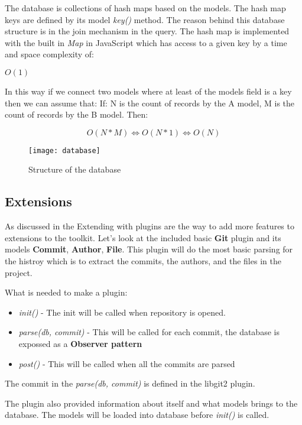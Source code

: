 The database is collections of hash maps based on the models. The hash map keys are defined by its model \textit{key()} method.
The reason behind this database structure is in the join mechanism in the query. The hash map is implemented with the built in 
\textit{Map}\cite{map} in JavaScript which has access to a given key by a time and space complexity of:

\( O(1) \)

In this way if we connect two models where at least of the models field is a key then we can assume that:\newline
If: N is the count of records by the A model, M  is the count of records by the B model. Then:
	
\[O(N * M) \Leftrightarrow O(N * 1) \Leftrightarrow O(N)\]

\begin{figure}[H]
	\centering
	\texttt{[image: database]}
	\caption{Structure of the database}
	\label{fig:fig-help}
\end{figure}
\newpage

\subsection{Extensions}

As discussed in the Extending with plugins are the way to add more features to extensions to the toolkit.
Let's look at the included basic \textbf{Git} plugin and its models \textbf{Commit}, \textbf{Author}, \textbf{File}.
This plugin will do the most basic parsing for the histroy which is to extract the commits, the authors, and the files
in the project.

What is needed to make a plugin:
\begin{itemize}
	\item \textit{init()} - The init will be called when repository is opened.
	\item \textit{parse(db, commit)} - This will be called for each commit, the database is expossed as a \textbf{Observer pattern}
	\item \textit{post()} - This will be called when all the commits are parsed
\end{itemize}

The commit in the \textit{parse(db, commit)} is defined in the libgit2 plugin.

The plugin also provided information about itself and what models brings to the database. 
The models will be loaded into database before \textit{init()} is called.

